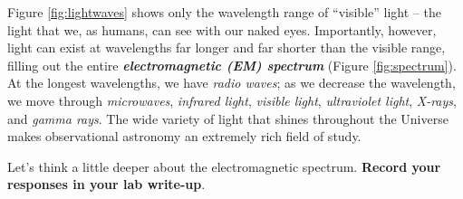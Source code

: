 \documentclass[11pt]{article}
\begin{document}
Figure \ref{fig:lightwaves} shows only the wavelength range of ``visible'' light -- the light that we, as humans, can see with our naked eyes. Importantly, however, light can exist at wavelengths far longer and far shorter than the visible range, filling out the entire \emph{\textbf{electromagnetic (EM) spectrum}} (Figure \ref{fig:spectrum}). At the longest wavelengths, we have \emph{radio waves}; as we decrease the wavelength, we move through \emph{microwaves}, \emph{infrared light}, \emph{visible light}, \emph{ultraviolet light}, \emph{X-rays}, and \emph{gamma rays}. The wide variety of light that shines throughout the Universe makes observational astronomy an extremely rich field of study. 

\bigskip

Let's think a little deeper about the electromagnetic spectrum. \textbf{Record your responses in your lab write-up}. 
\end{document}
